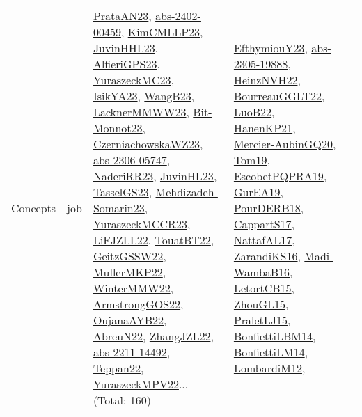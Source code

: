 {\begin{longtable}{lp{3cm}>{\raggedright}p{6cm}>{\raggedright}p{6cm}p{8cm}}
Concepts & job & \href{articles/PrataAN23.pdf}{PrataAN23}\cite{PrataAN23}, \href{articles/abs-2402-00459.pdf}{abs-2402-00459}\cite{abs-2402-00459}, \href{papers/KimCMLLP23.pdf}{KimCMLLP23}\cite{KimCMLLP23}, \href{papers/JuvinHHL23.pdf}{JuvinHHL23}\cite{JuvinHHL23}, \href{articles/AlfieriGPS23.pdf}{AlfieriGPS23}\cite{AlfieriGPS23}, \href{papers/YuraszeckMC23.pdf}{YuraszeckMC23}\cite{YuraszeckMC23}, \href{articles/IsikYA23.pdf}{IsikYA23}\cite{IsikYA23}, \href{papers/WangB23.pdf}{WangB23}\cite{WangB23}, \href{articles/LacknerMMWW23.pdf}{LacknerMMWW23}\cite{LacknerMMWW23}, \href{papers/Bit-Monnot23.pdf}{Bit-Monnot23}\cite{Bit-Monnot23}, \href{articles/CzerniachowskaWZ23.pdf}{CzerniachowskaWZ23}\cite{CzerniachowskaWZ23}, \href{articles/abs-2306-05747.pdf}{abs-2306-05747}\cite{abs-2306-05747}, \href{articles/NaderiRR23.pdf}{NaderiRR23}\cite{NaderiRR23}, \href{papers/JuvinHL23.pdf}{JuvinHL23}\cite{JuvinHL23}, \href{papers/TasselGS23.pdf}{TasselGS23}\cite{TasselGS23}, \href{papers/Mehdizadeh-Somarin23.pdf}{Mehdizadeh-Somarin23}\cite{Mehdizadeh-Somarin23}, \href{articles/YuraszeckMCCR23.pdf}{YuraszeckMCCR23}\cite{YuraszeckMCCR23}, \href{papers/LiFJZLL22.pdf}{LiFJZLL22}\cite{LiFJZLL22}, \href{papers/TouatBT22.pdf}{TouatBT22}\cite{TouatBT22}, \href{papers/GeitzGSSW22.pdf}{GeitzGSSW22}\cite{GeitzGSSW22}, \href{articles/MullerMKP22.pdf}{MullerMKP22}\cite{MullerMKP22}, \href{papers/WinterMMW22.pdf}{WinterMMW22}\cite{WinterMMW22}, \href{papers/ArmstrongGOS22.pdf}{ArmstrongGOS22}\cite{ArmstrongGOS22}, \href{papers/OujanaAYB22.pdf}{OujanaAYB22}\cite{OujanaAYB22}, \href{articles/AbreuN22.pdf}{AbreuN22}\cite{AbreuN22}, \href{papers/ZhangJZL22.pdf}{ZhangJZL22}\cite{ZhangJZL22}, \href{articles/abs-2211-14492.pdf}{abs-2211-14492}\cite{abs-2211-14492}, \href{papers/Teppan22.pdf}{Teppan22}\cite{Teppan22}, \href{articles/YuraszeckMPV22.pdf}{YuraszeckMPV22}\cite{YuraszeckMPV22}... (Total: 160) & \href{papers/EfthymiouY23.pdf}{EfthymiouY23}\cite{EfthymiouY23}, \href{articles/abs-2305-19888.pdf}{abs-2305-19888}\cite{abs-2305-19888}, \href{articles/HeinzNVH22.pdf}{HeinzNVH22}\cite{HeinzNVH22}, \href{articles/BourreauGGLT22.pdf}{BourreauGGLT22}\cite{BourreauGGLT22}, \href{papers/LuoB22.pdf}{LuoB22}\cite{LuoB22}, \href{papers/HanenKP21.pdf}{HanenKP21}\cite{HanenKP21}, \href{papers/Mercier-AubinGQ20.pdf}{Mercier-AubinGQ20}\cite{Mercier-AubinGQ20}, \href{papers/Tom19.pdf}{Tom19}\cite{Tom19}, \href{articles/EscobetPQPRA19.pdf}{EscobetPQPRA19}\cite{EscobetPQPRA19}, \href{articles/GurEA19.pdf}{GurEA19}\cite{GurEA19}, \href{articles/PourDERB18.pdf}{PourDERB18}\cite{PourDERB18}, \href{papers/CappartS17.pdf}{CappartS17}\cite{CappartS17}, \href{articles/NattafAL17.pdf}{NattafAL17}\cite{NattafAL17}, \href{articles/ZarandiKS16.pdf}{ZarandiKS16}\cite{ZarandiKS16}, \href{papers/Madi-WambaB16.pdf}{Madi-WambaB16}\cite{Madi-WambaB16}, \href{articles/LetortCB15.pdf}{LetortCB15}\cite{LetortCB15}, \href{papers/ZhouGL15.pdf}{ZhouGL15}\cite{ZhouGL15}, \href{papers/PraletLJ15.pdf}{PraletLJ15}\cite{PraletLJ15}, \href{articles/BonfiettiLBM14.pdf}{BonfiettiLBM14}\cite{BonfiettiLBM14}, \href{papers/BonfiettiLM14.pdf}{BonfiettiLM14}\cite{BonfiettiLM14}, \href{articles/LombardiM12.pdf}{LombardiM12}\cite{LombardiM12}, 
\end{longtable}}
